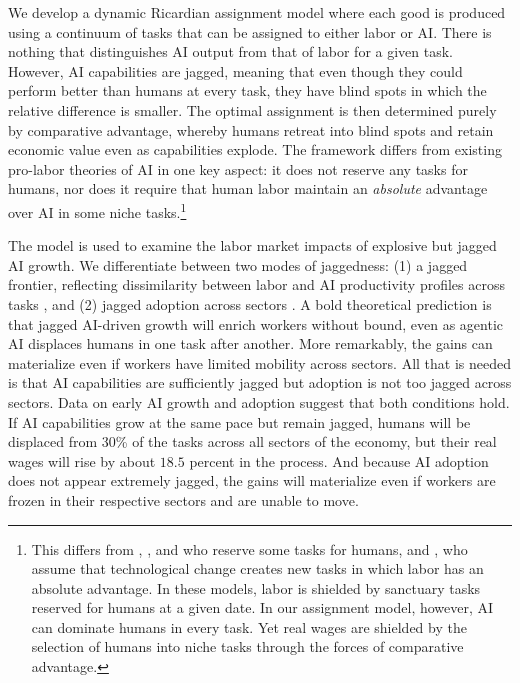 \documentclass[11pt]{article}
\begin{document}
We develop a dynamic Ricardian assignment model where each good is
produced using a continuum of tasks that can be assigned to either
labor or AI. There is nothing that distinguishes AI output from that
of labor for a given task. However, AI capabilities are jagged, meaning
that even though they could perform better than humans at every task,
they have blind spots in which the relative difference is smaller.
The optimal assignment is then determined purely by comparative advantage,
whereby humans retreat into blind spots and retain economic value
even as capabilities explode. The framework differs from existing
pro-labor theories of AI in one key aspect: it does not reserve any
tasks for humans, nor does it require that human labor maintain an
\emph{absolute} advantage over AI in some niche tasks.\footnote{This differs from \citet{ks2024}, \citet{abr2023}, and \citet{jt2026}
who reserve some tasks for humans, and \citet{ar2018}, who assume
that technological change creates new tasks in which labor has an
absolute advantage. In these models, labor is shielded by sanctuary
tasks reserved for humans at a given date. In our assignment model,
however, AI can dominate humans in every task. Yet real wages are
shielded by the selection of humans into niche tasks through the forces
of comparative advantage.}

The model is used to examine the labor market impacts of explosive
but jagged AI growth. We differentiate between two modes of jaggedness:
(1) a jagged frontier, reflecting dissimilarity between labor and
AI productivity profiles across tasks \citep{dellacqua2026}, and
(2) jagged adoption across sectors \citep{rinehart2026}. A bold theoretical
prediction is that jagged AI-driven growth will enrich workers without
bound, even as agentic AI displaces humans in one task after another.
More remarkably, the gains can materialize even if workers have limited
mobility across sectors. All that is needed is that AI capabilities
are sufficiently jagged but adoption is not too jagged across sectors.
Data on early AI growth and adoption suggest that both conditions
hold. If AI capabilities grow at the same pace but remain jagged,
humans will be displaced from 30\% of the tasks across all sectors
of the economy, but their real wages will rise by about $18.5$
percent in the process. And because AI adoption does not appear extremely
jagged, the gains will materialize even if workers are frozen in their
respective sectors and are unable to move.
\end{document}
